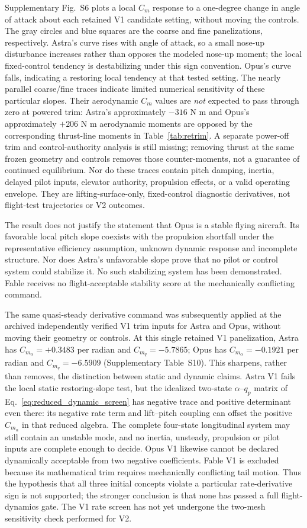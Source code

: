 \documentclass[11pt,a4paper]{article}
\begin{document}
Supplementary Fig.~S6 plots a local $C_m$ response to a one-degree change in angle of attack about each retained V1 candidate setting, without moving the controls. The gray circles and blue squares are the coarse and fine panelizations, respectively. Astra's curve rises with angle of attack, so a small nose-up disturbance increases rather than opposes the modeled nose-up moment; the local fixed-control tendency is destabilizing under this sign convention. Opus's curve falls, indicating a restoring local tendency at that tested setting. The nearly parallel coarse/fine traces indicate limited numerical sensitivity of these particular slopes. Their aerodynamic $C_m$ values are \emph{not} expected to pass through zero at powered trim: Astra's approximately $-316$ N m and Opus's approximately $+206$ N m aerodynamic moments are opposed by the corresponding thrust-line moments in Table~\ref{tab:retrim}. A separate power-off trim and control-authority analysis is still missing; removing thrust at the same frozen geometry and controls removes those counter-moments, not a guarantee of continued equilibrium. Nor do these traces contain pitch damping, inertia, delayed pilot inputs, elevator authority, propulsion effects, or a valid operating envelope. They are lifting-surface-only, fixed-control diagnostic derivatives, not flight-test trajectories or V2 outcomes.

The result does not justify the statement that Opus is a stable flying aircraft. Its favorable local pitch slope coexists with the propulsion shortfall under the representative efficiency assumption, unknown dynamic response and incomplete structure. Nor does Astra's unfavorable slope prove that no pilot or control system could stabilize it. No such stabilizing system has been demonstrated. Fable receives no flight-acceptable stability score at the mechanically conflicting command.

The same quasi-steady derivative command was subsequently applied at the archived independently verified V1 trim inputs for Astra and Opus, without moving their geometry or controls. At this single retained V1 panelization, Astra has $C_{m_\alpha}=+0.3483$ per radian and $C_{m_q}=-5.7865$; Opus has $C_{m_\alpha}=-0.1921$ per radian and $C_{m_q}=-6.5909$ (Supplementary Table~S10). This sharpens, rather than removes, the distinction between static and dynamic claims. Astra V1 fails the local static restoring-slope test, but the idealized two-state $\alpha$--$q_p$ matrix of Eq.~\ref{eq:reduced_dynamic_screen} has negative trace and positive determinant even there: its negative rate term and lift--pitch coupling can offset the positive $C_{m_\alpha}$ in that reduced algebra. The complete four-state longitudinal system may still contain an unstable mode, and no inertia, unsteady, propulsion or pilot inputs are complete enough to decide. Opus V1 likewise cannot be declared dynamically acceptable from two negative coefficients. Fable V1 is excluded because its mathematical trim requires mechanically conflicting tail motion. Thus the hypothesis that all three initial concepts violate a particular rate-derivative sign is not supported; the stronger conclusion is that none has passed a full flight-dynamics gate. The V1 rate screen has not yet undergone the two-mesh sensitivity check performed for V2.
\end{document}
